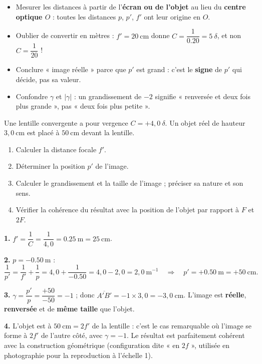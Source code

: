 \documentclass[11pt]{article}
\begin{document}
\begin{attention}
\begin{itemize}
\item Mesurer les distances à partir de l'\textbf{écran ou de l'objet} au lieu du \textbf{centre optique $O$} : toutes les distances $p$, $p'$, $f'$ ont leur origine en $O$.
\item Oublier de convertir en mètres : $f' = 20\ \mathrm{cm}$ donne $C = \dfrac{1}{\num{0,20}} = 5\ \delta$, et non $C = \dfrac{1}{20}$ !
\item Conclure « image réelle » parce que $p'$ est grand : c'est le \textbf{signe} de $p'$ qui décide, pas sa valeur.
\item Confondre $\gamma$ et $|\gamma|$ : un grandissement de $-2$ signifie « renversée et deux fois plus grande », pas « deux fois plus petite ».
\end{itemize}
\end{attention}

\begin{exercice}
Une lentille convergente a pour vergence $C = +4{,}0\ \delta$. Un objet réel de hauteur $3{,}0\ \mathrm{cm}$ est placé à $50\ \mathrm{cm}$ devant la lentille.
\begin{enumerate}
\item Calculer la distance focale $f'$.
\item Déterminer la position $p'$ de l'image.
\item Calculer le grandissement et la taille de l'image ; préciser sa nature et son sens.
\item Vérifier la cohérence du résultat avec la position de l'objet par rapport à $F$ et $2F$.
\end{enumerate}
\end{exercice}

\begin{corrige}[Exercice n°1]
\textbf{1.} $f' = \dfrac{1}{C} = \dfrac{1}{4{,}0} = \num{0,25}\ \mathrm{m} = 25\ \mathrm{cm}$.

\textbf{2.} $p = \num{-0,50}\ \mathrm{m}$ :
\[ \frac{1}{p'} = \frac{1}{f'} + \frac{1}{p} = 4{,}0 + \frac{1}{\num{-0,50}} = 4{,}0 - 2{,}0 = 2{,}0\ \mathrm{m^{-1}} \quad\Longrightarrow\quad p' = +\num{0,50}\ \mathrm{m} = +50\ \mathrm{cm}. \]

\textbf{3.} $\gamma = \dfrac{p'}{p} = \dfrac{+50}{-50} = -1$ ; donc $\overline{A'B'} = -1 \times 3{,}0 = -3{,}0\ \mathrm{cm}$. L'image est \textbf{réelle}, \textbf{renversée} et de \textbf{même taille} que l'objet.

\textbf{4.} L'objet est à $50\ \mathrm{cm} = 2f'$ de la lentille : c'est le cas remarquable où l'image se forme à $2f'$ de l'autre côté, avec $\gamma = -1$. Le résultat est parfaitement cohérent avec la construction géométrique (configuration dite « en $2f$ », utilisée en photographie pour la reproduction à l'échelle 1).
\end{corrige}
\end{document}
